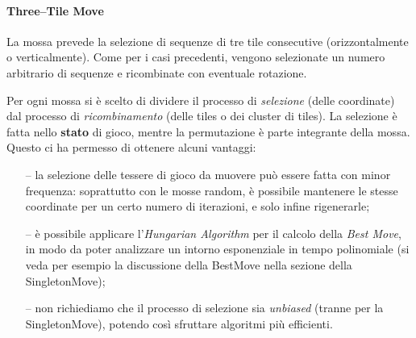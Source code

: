 
    \paragraph{Three--Tile Move} %
    \label{par:three_tile_move}

        La mossa prevede la selezione di sequenze di tre tile consecutive (orizzontalmente o verticalmente). Come per i casi precedenti, vengono selezionate un numero arbitrario di sequenze e ricombinate con eventuale rotazione.
    

    Per ogni mossa si è scelto di dividere il processo di \emph{selezione} (delle coordinate) dal processo di \emph{ricombinamento} (delle tiles o dei cluster di tiles). La selezione è fatta nello \textbf{stato} di gioco, mentre la permutazione è parte integrante della mossa. Questo ci ha permesso di ottenere alcuni vantaggi:
    \begin{itemize}
        \item[--] la selezione delle tessere di gioco da muovere può essere fatta con minor frequenza: soprattutto con le mosse random, è possibile mantenere le stesse coordinate per un certo numero di iterazioni, e solo infine rigenerarle;
        \item[--] è possibile applicare l'\emph{Hungarian Algorithm} per il calcolo della \emph{Best Move}, in modo da poter analizzare un intorno esponenziale in tempo polinomiale (si veda per esempio la discussione della BestMove nella sezione della SingletonMove);
        \item[--] non richiediamo che il processo di selezione sia \emph{unbiased} (tranne per la SingletonMove), potendo così sfruttare algoritmi più efficienti.
    \end{itemize}
    
